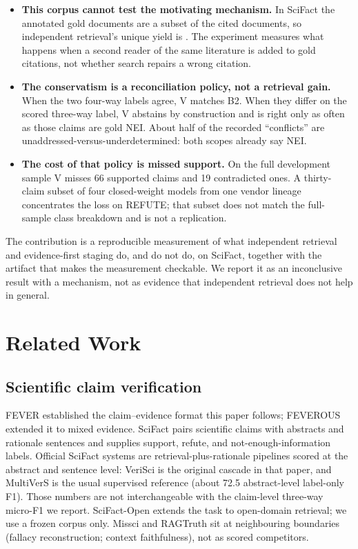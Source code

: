 \documentclass[11pt,a4paper]{article}
\begin{document}
\begin{itemize}
  \item \textbf{This corpus cannot test the motivating mechanism.} In
    SciFact the annotated gold documents are a subset of the cited
    documents, so independent retrieval's unique yield is
    \retrievalUnique{}. The experiment measures what happens when a
    second reader of the same literature is added to gold citations, not
    whether search repairs a wrong citation.
  \item \textbf{The conservatism is a reconciliation policy, not a
    retrieval gain.} When the two four-way labels agree, V matches B2.
    When they differ on the scored three-way label, V abstains by
    construction and is right only as often as those claims are gold NEI.
    About half of the recorded ``conflicts'' are
    unaddressed-versus-underdetermined: both scopes already say NEI.
  \item \textbf{The cost of that policy is missed support.} On the full
    development sample V misses 66 supported claims and 19 contradicted
    ones. A thirty-claim subset of four closed-weight models from one
    vendor lineage concentrates the loss on REFUTE; that subset does not
    match the full-sample class breakdown and is not a replication.
\end{itemize}

The contribution is a reproducible measurement of what independent
retrieval and evidence-first staging do, and do not do, on SciFact,
together with the artifact that makes the measurement checkable. We
report it as an inconclusive result with a mechanism, not as evidence
that independent retrieval does not help in general.

\section{Related Work}

\subsection{Scientific claim verification}

FEVER \citep{thorne2018fever} established the claim--evidence format this
paper follows; FEVEROUS \citep{aly2021feverous} extended it to mixed
evidence. SciFact \citep{wadden2020scifact} pairs scientific claims with
abstracts and rationale sentences and supplies support, refute, and
not-enough-information labels. Official SciFact systems are
retrieval-plus-rationale pipelines scored at the abstract and sentence
level: VeriSci is the original cascade in that paper, and MultiVerS
\citep{wadden2022multivers} is the usual supervised reference (about 72.5
abstract-level label-only F1). Those numbers are not interchangeable with
the claim-level three-way micro-F1 we report. SciFact-Open
\citep{wadden2022scifactopen} extends the task to open-domain retrieval;
we use a frozen corpus only. Missci \citep{glockner2024missci} and
RAGTruth \citep{niu2024ragtruth} sit at neighbouring boundaries
(fallacy reconstruction; context faithfulness), not as scored
competitors.
\end{document}
